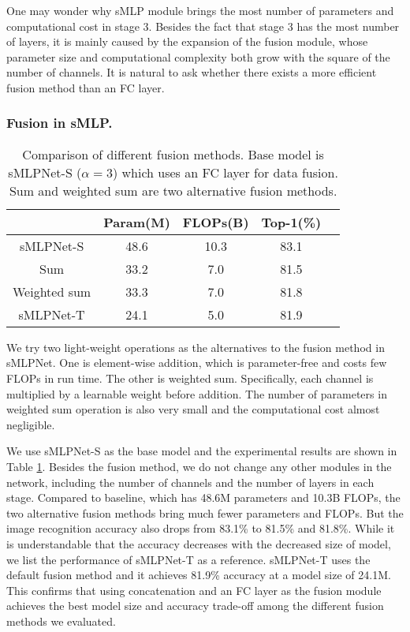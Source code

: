 \documentclass[letterpaper]{article} \usepackage{aaai22}  \usepackage{times}  \usepackage{helvet}  \usepackage{courier}  \usepackage[hyphens]{url}  \usepackage{graphicx} \usepackage{color}
\begin{document}
One may wonder why sMLP module brings the most number of parameters and computational cost in stage 3. Besides the fact that stage 3 has the most number of layers, it is mainly caused by the expansion of the fusion module, whose parameter size and computational complexity both grow with the square of the number of channels. It is natural to ask whether there exists a more efficient fusion method than an FC layer. 



\subsubsection{Fusion in sMLP.}
\begin{table}[t]
\centering
\begin{tabular}{c|c c c c}
    \hline
    & Param(M) & FLOPs(B) & Top-1(\%) \\
    \hline
sMLPNet-S     &48.6 &10.3 &83.1  \\
    \hline
    Sum    &33.2 &7.0 & 81.5  \\
    Weighted sum    &33.3 &7.0 &81.8  \\
    \hline
    sMLPNet-T & 24.1 & 5.0 & 81.9 \\
    \hline
\end{tabular}
\caption{Comparison of different fusion methods. Base model is sMLPNet-S ($\alpha=3$) which uses an FC layer for data fusion. Sum and weighted sum are two alternative fusion methods.}
\label{tab:Fusion method}
\end{table}
We try two light-weight operations as the alternatives to the fusion method in sMLPNet. One is element-wise addition, which is parameter-free and costs few FLOPs in run time. The other is weighted sum. Specifically, each channel is multiplied by a learnable weight before addition. The number of parameters in weighted sum operation is also very small and the computational cost almost negligible. 

We use sMLPNet-S as the base model and the experimental results are shown in Table \ref{tab:Fusion method}. Besides the fusion method, we do not change any other modules in the network, including the number of channels and the number of layers in each stage. Compared to baseline, which has 48.6M parameters and 10.3B FLOPs, the two alternative fusion methods bring much fewer parameters and FLOPs. But the image recognition accuracy also drops from 83.1\% to 81.5\% and 81.8\%. While it is understandable that the accuracy decreases with the decreased size of model, we list the performance of sMLPNet-T as a reference. sMLPNet-T uses the default fusion method and it achieves 81.9\% accuracy at a model size of 24.1M. This confirms that using concatenation and an FC layer as the fusion module achieves the best model size and accuracy trade-off among the different fusion methods we evaluated. 
\end{document}
